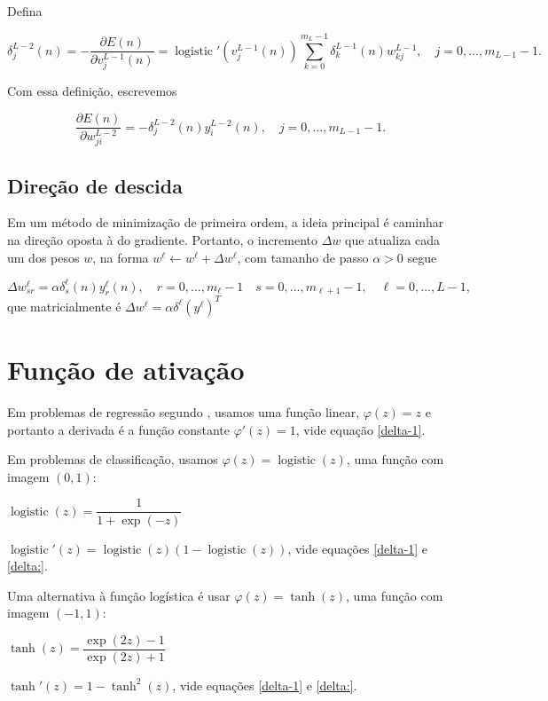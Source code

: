 \documentclass[12pt,a4paper]{article}
\DeclareMathOperator{\logistic}{logistic}
\begin{document}
Defina

\begin{equation}\label{delta:}
\delta^{L-2}_j(n)
=
-\dfrac{\partial E(n)}{\partial v_j^{L-1}(n)}
=\displaystyle
 \logistic'(v_j^{L-1}(n))   \sum_{k=0}^{m_L-1}
\delta^{L-1}_k(n)  w_{kj}^{L-1} 
, \quad j=0,...,m_{L-1}-1.
\end{equation}

Com essa definição, escrevemos

\begin{equation}
\dfrac{\partial E(n)}{\partial w^{L-2}_{ji}}
=
-\delta^{L-2}_j(n)y_i^{L-2}(n)
, \quad j=0,...,m_{L-1}-1 .
\end{equation}

\subsection{Direção de descida}
Em um método de minimização de primeira ordem, a ideia principal é caminhar na direção oposta à do gradiente. Portanto, o incremento $\Delta w$ que atualiza cada um dos pesos $w$, na forma $w^\ell\gets w^\ell+ \Delta w^\ell$, com tamanho de passo $\alpha>0$ segue

\begin{equation}
\Delta w^{\ell}_{sr} = \alpha \delta_s^{\ell}(n)y_r^{\ell}(n),
\quad r=0,...,m_{\ell}-1 
\quad s=0,...,m_{\ell+1}-1,
\quad \ell=0,...,L-1,
\end{equation}
que matricialmente é
$
\Delta w^\ell = \alpha\delta^\ell(y^\ell)^T
$

\section{Função de ativação}
Em problemas de regressão segundo \cite{riedmiller}, usamos uma função linear, $\varphi(z)=z$ e portanto a derivada é a função constante $\varphi'(z)=1$, vide equação \eqref{delta-1}.

Em problemas de classificação, usamos $\varphi(z)=\logistic(z)$, uma função com imagem $(0,1)$:

$
\logistic(z) = \dfrac{1}{1+\exp(-z)}
$

$
\logistic'(z) = \logistic(z)(1-\logistic(z))
$, vide equações \eqref{delta-1} e \eqref{delta:}.


Uma alternativa à função logística é usar $\varphi(z)=\tanh(z)$, uma função com imagem $(-1,1)$:

$
\tanh(z) = \dfrac{\exp(2z)-1}{\exp(2z)+1}
$

$
\tanh'(z) = 1 - \tanh^2(z)
$, vide equações \eqref{delta-1} e \eqref{delta:}.
\end{document}
